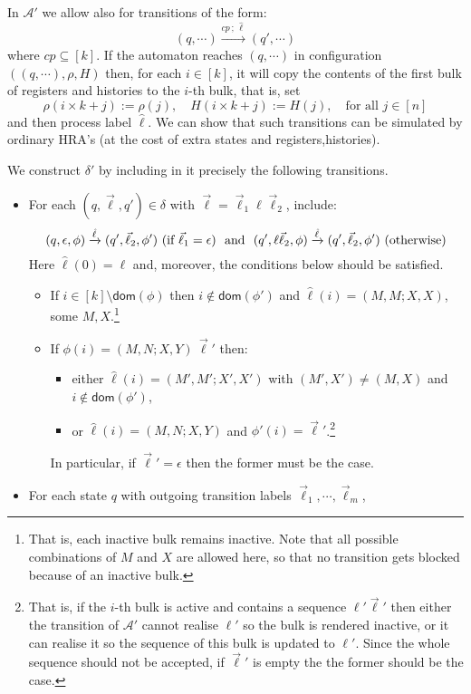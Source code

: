 \documentclass{article}
\theoremstyle{definition}
\renewcommand\AA{\mathcal{A}}
\newcommand\dom{\mathsf{dom}}
\newcommand\ta{,}
\begin{document}
In $\AA'$ we allow also for transitions of the form:
\[
(q,\cdots)\xrightarrow{\mathit{cp}\,;\,\hat\ell}(q',\cdots)
\]
where $\mathit{cp}\subseteq[k]$. If the automaton reaches $(q,\cdots)$ in configuration $((q,\cdots),\rho,H)$ then, for each $i\in[k]$, it will copy the contents of the first bulk of registers and histories to the $i$-th bulk, that is, set
\[
\rho(i\times k+j):=\rho(j),\quad
H(i\times k+j):=H(j),\quad\text{for all }j\in[n]
\]
and then process label $\hat\ell$. We can show that such transitions can be simulated by ordinary HRA's (at the cost of extra states and registers\ta histories).

We construct $\delta'$ by including in it precisely the following transitions. 
\begin{itemize}
\item For each $(q,\vec\ell,q')\in\delta$ with $\vec\ell=\vec\ell_1\ell\vec\ell_2$, include:
\[
(q,\epsilon,\phi)\xrightarrow{\hat{\ell}}(q',\vec\ell_2,\phi')\text{ (if $\vec\ell_1=\epsilon$) \
and \ }
(q',\ell\vec\ell_2,\phi)\xrightarrow{\hat{\ell}}(q',\vec\ell_2,\phi')\text{ (otherwise)}
\]
Here $\hat\ell(0)=\ell$ and, moreover, the conditions below should be satisfied.
\begin{itemize}
\item If $i\in[k]\setminus\dom(\phi)$ then $i\notin\dom(\phi')$ and $\hat\ell(i)=(M\ta M;X\ta X)$, some $M,X$.\footnote{That is, each inactive bulk remains inactive. Note that all possible combinations of $M$ and $X$ are allowed here, so that no transition gets blocked because of an inactive bulk.}
\item If $\phi(i)=(M\ta N;X\ta Y)\,\vec\ell'$ then:
\begin{itemize}
\item either $\hat\ell(i)=(M'\ta M';X'\ta X')$ with $(M',X')\not=(M,X)$ and $i\notin\dom(\phi')$,
\item or $\hat\ell(i)=(M\ta N;X\ta Y)$ and $\phi'(i)=\vec\ell'$.\footnote{That is, if the $i$-th bulk is active and contains a sequence $\ell'\vec\ell'$ then either the transition of $\AA'$ cannot realise $\ell'$ so the bulk is rendered inactive, or it can realise it so the sequence of this bulk is updated to $\ell'$. Since the whole sequence should not be accepted, if $\vec\ell'$ is empty the the former should be the case.}
\end{itemize}
In particular, if $\vec\ell'=\epsilon$ then the former must be the case.
\end{itemize}
\item For each state $q$ with outgoing transition labels $\vec\ell_1,\cdots,\vec\ell_m$, 

\end{itemize}
\end{document}
